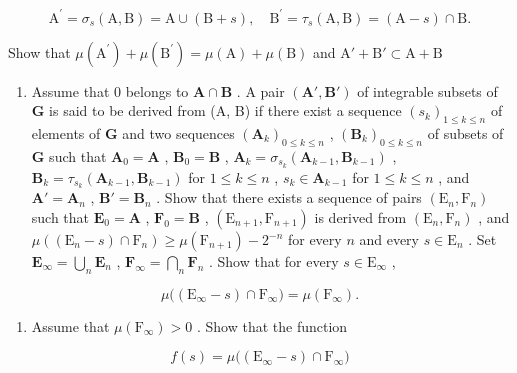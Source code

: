 \[
\mathrm{A} ^ {\prime} = \sigma_ {s} (\mathrm{A}, \mathrm{B}) = \mathrm{A} \cup (\mathrm{B} + s), \quad \mathrm{B} ^ {\prime} = \tau_ {s} (\mathrm{A}, \mathrm{B}) = (\mathrm{A} - s) \cap \mathrm{B}.
\]

Show that \(\mu (\mathrm{A}^{\prime}) + \mu (\mathrm{B}^{\prime}) = \mu (\mathrm{A}) + \mu (\mathrm{B})\) and \(\mathrm{A}' + \mathrm{B}'\subset \mathrm{A} + \mathrm{B}\)

\begin{enumerate}
\def\labelenumi{\alph{enumi})}
\setcounter{enumi}{1}
\tightlist
\item
  Assume that 0 belongs to \(\mathbf{A} \cap \mathbf{B}\) . A pair \((\mathbf{A}', \mathbf{B}')\) of integrable subsets of \(\mathbf{G}\) is said to be derived from (A, B) if there exist a sequence \((s_k)_{1 \leqslant k \leqslant n}\) of elements of \(\mathbf{G}\) and two sequences \((\mathbf{A}_k)_{0 \leqslant k \leqslant n}\) , \((\mathbf{B}_k)_{0 \leqslant k \leqslant n}\) of subsets of \(\mathbf{G}\) such that \(\mathbf{A}_0 = \mathbf{A}\) , \(\mathbf{B}_0 = \mathbf{B}\) , \(\mathbf{A}_k = \sigma_{s_k}(\mathbf{A}_{k-1}, \mathbf{B}_{k-1})\) , \(\mathbf{B}_k = \tau_{s_k}(\mathbf{A}_{k-1}, \mathbf{B}_{k-1})\) for \(1 \leqslant k \leqslant n\) , \(s_k \in \mathbf{A}_{k-1}\) for \(1 \leqslant k \leqslant n\) , and \(\mathbf{A}' = \mathbf{A}_n\) , \(\mathbf{B}' = \mathbf{B}_n\) . Show that there exists a sequence of pairs \((\mathrm{E}_n, \mathrm{F}_n)\) such that \(\mathbf{E}_0 = \mathbf{A}\) , \(\mathbf{F}_0 = \mathbf{B}\) , \((\mathrm{E}_{n+1}, \mathrm{F}_{n+1})\) is derived from \((\mathrm{E}_n, \mathrm{F}_n)\) , and \(\mu((\mathrm{E}_n - s) \cap \mathrm{F}_n) \geqslant \mu(\mathrm{F}_{n+1}) - 2^{-n}\) for every \(n\) and every \(s \in \mathrm{E}_n\) . Set \(\mathbf{E}_{\infty} = \bigcup_{n} \mathbf{E}_n\) , \(\mathbf{F}_{\infty} = \bigcap_{n} \mathbf{F}_n\) . Show that for every \(s \in \mathrm{E}_{\infty}\) ,
\end{enumerate}

\[
\mu \big ((\mathrm{E} _ {\infty} - s) \cap \mathrm{F} _ {\infty} \big) = \mu (\mathrm{F} _ {\infty}).
\]

\begin{enumerate}
\def\labelenumi{\alph{enumi})}
\setcounter{enumi}{2}
\tightlist
\item
  Assume that \(\mu (\mathrm{F}_{\infty}) > 0\) . Show that the function
\end{enumerate}

\[
f (s) = \mu \big ((\mathrm{E} _ {\infty} - s) \cap \mathrm{F} _ {\infty} \big)
\]


